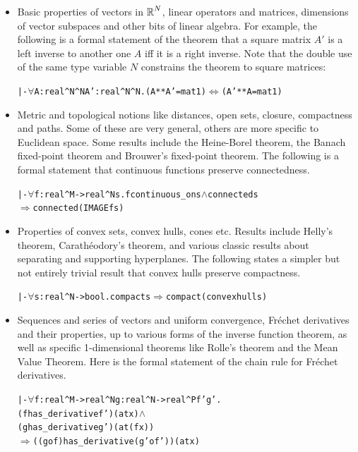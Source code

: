 \documentclass[11pt]{amsart}
\def\sz{small} %
\newcommand{\real}{\mbox{$\protect\mathbb R$}}
\let\And=\wedge                    %
\newcommand{\Imp}{\Rightarrow}
\newcommand{\Iff}{\Leftrightarrow}
\begin{document}
\begin{itemize}

\item Basic properties of vectors in $\real^N$, linear operators and matrices,
dimensions of vector subspaces and other bits of linear algebra. For example,
the following is a formal statement of the theorem that a square matrix $A'$ is
a left inverse to another one $A$ iff it is a right inverse. Note that the
double use of the same type variable $N$ constrains the theorem to square
matrices:

\begin{\sz}
\begin{alltt}
|- \(\forall\)A:real^N^N A':real^N^N. (A ** A' = mat 1) \(\Iff\) (A' ** A = mat 1)
\end{alltt}
\end{\sz}

\item Metric and topological notions like distances, open sets, closure,
compactness and paths. Some of these are very general, others are more specific
to Euclidean space. Some results include the Heine-Borel theorem, the Banach
fixed-point theorem and Brouwer's fixed-point theorem. The following is a
formal statement that continuous functions preserve connectedness.

\begin{\sz}
\begin{alltt}
|-  \(\forall\)f:real^M->real^N s. f continuous_on s \(\And\) connected s 
         \(\Imp\) connected(IMAGE f s)
\end{alltt}
\end{\sz}

\item Properties of convex sets, convex hulls, cones etc. Results include
Helly's theorem, Carath\'eodory's theorem, and various classic results about
separating and supporting hyperplanes. The following states a simpler but not
entirely trivial result that convex hulls preserve compactness.

\begin{\sz}\begin{alltt}
|- \(\forall\)s:real^N->bool. compact s \(\Imp\) compact(convex hull s)
\end{alltt}\end{\sz}

\item Sequences and series of vectors and uniform convergence, Fr\'echet
derivatives and their properties, up to various forms of the inverse function
theorem, as well as specific 1-dimensional theorems like Rolle's theorem and
the Mean Value Theorem. Here is the formal statement of the chain rule for
Fr\'echet derivatives.

\begin{\sz}\begin{alltt}
|- \(\forall\)f:real^M->real^N g:real^N->real^P f' g'.
        (f has_derivative f') (at x) \(\And\)
        (g has_derivative g') (at (f x))
        \(\Imp\) ((g o f) has_derivative (g' o f')) (at x)
\end{alltt}\end{\sz}

\end{itemize}
\end{document}
